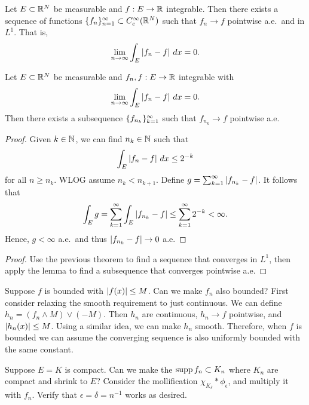 \documentclass[a4paper]{article}
\begin{document}
\begin{thm}

  Let $E \subset \mathbb{R}^N$ be measurable and $f : E \to \mathbb{R}$ integrable. Then
  there exists a sequence of functions $\{ f_n \}_{n=1}^\infty \subset
  C_c^\infty(\mathbb{R}^N)$ such that $f_n \to f$ pointwise a.e.\ and in $L^1$.
  That is,
  \[
    \lim_{n \to \infty}  \int_E \left\lvert f_n - f\right\rvert \, d x = 0.
  \]
\end{thm}

\begin{lemma}
  Let $E \subset \mathbb{R}^N$ be measurable and $f_n, f : E \to \mathbb{R}$ integrable
  with
  \[
    \lim_{n \to \infty}  \int_E \left\lvert f_n - f\right\rvert \, d x = 0.
  \]
  Then there exists a subsequence $\{ f_{n_k} \}_{k=1}^\infty$ such that $f_{n_k}
  \to f$ pointwise a.e.
\end{lemma}

\begin{proof}

  Given $k \in \mathbb{N}$, we can find $n_k \in \mathbb{N}$ such that
  \[
    \int_E \left\lvert f_n - f\right\rvert  \, d x \leq 2^{-k}
  \]
  for all $n \geq n_k$. WLOG assume $n_k < n_{k + 1}$. Define $g =
  \sum_{k=1}^\infty \left\lvert f_{n_k} - f\right\rvert$. It follows that
  \[
    \int_E g
    = \sum_{k=1}^\infty \int_E \left\lvert f_{n_k} - f\right\rvert
    \leq \sum_{k=1}^\infty 2^{-k}
    < \infty.
  \]
  Hence, $g < \infty$ a.e.\ and thus $\left\lvert f_{n_k} - f\right\rvert \to 0$ a.e.
\end{proof}

\begin{proof}

  Use the previous theorem to find a sequence that converges in $L^1$,
  then apply the lemma to find a subsequence that converges pointwise a.e.
\end{proof}

\begin{remark}

  Suppose $f$ is bounded with $\left\lvert f(x)\right\rvert \leq M$. Can we make $f_n$ also
  bounded? First consider relaxing the smooth requirement to just
  continuous. We can define $h_n = (f_n \wedge M) \vee (-M)$. Then $h_n$
  are continuous, $h_n \to f$ pointwise, and $\left\lvert h_n(x)\right\rvert \leq M$. Using
  a similar idea, we can make $h_n$ smooth. Therefore, when $f$ is bounded
  we can assume the converging sequence is also uniformly bounded with the
  same constant.

  Suppose $E = K$ is compact. Can we make the $\operatorname{supp} f_n \subset K_n$
  where $K_n$ are compact and shrink to $E$? Consider the mollification
  $\chi_{K_\delta} * \phi_\epsilon$, and multiply it with $f_n$. Verify
  that $\epsilon = \delta = n^{-1}$ works as desired.
\end{remark}
\end{document}
